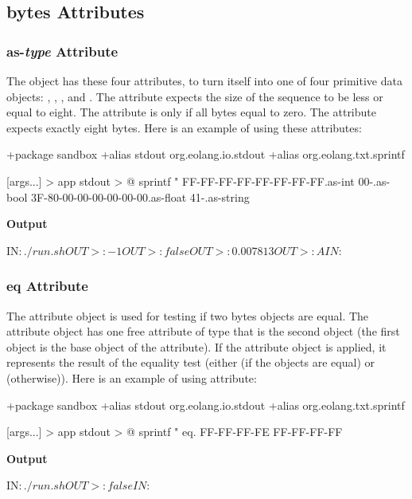 \documentclass[12pt]{book}
\begin{document}
{\subsection{bytes Attributes}

\subsubsection{as-\textit{type} Attribute}
The object  has these four attributes, to turn itself into one of four primitive data objects: , , , and .
The attribute  expects the size of the sequence to be less or equal to eight. The attribute  is  only if all bytes equal to zero. The attribute  expects exactly eight bytes.
Here is an example of using these attributes:
\begin{ffcode}
+package sandbox
+alias stdout org.eolang.io.stdout
+alias org.eolang.txt.sprintf

[args...] > app
  stdout > @
    sprintf
      "%
      FF-FF-FF-FF-FF-FF-FF-FF.as-int
      00-.as-bool
      3F-80-00-00-00-00-00-00.as-float
      41-.as-string
\end{ffcode}
\textbf{Output}
\begin{ffcode}
IN$: ./run.sh
OUT>: -1
OUT>: false
OUT>: 0.007813
OUT>: A
IN$: 
\end{ffcode}

\subsubsection{eq Attribute}
The  attribute object is used for testing if two bytes objects are equal. The  attribute object has one free attribute of type  that is the second object (the first object is the base object of the  attribute).
If the  attribute object is applied, it represents the result of the equality test (either  (if the objects are equal) or  (otherwise)).
Here is an example of using  attribute:
\begin{ffcode}
+package sandbox
+alias stdout org.eolang.io.stdout
+alias org.eolang.txt.sprintf

[args...] > app
stdout > @
  sprintf
    "%
    eq.
     FF-FF-FF-FE
     FF-FF-FF-FF
\end{ffcode}
\textbf{Output}
\begin{ffcode}
IN$: ./run.sh
OUT>: false
IN$: 
\end{ffcode}

}
\end{document}
